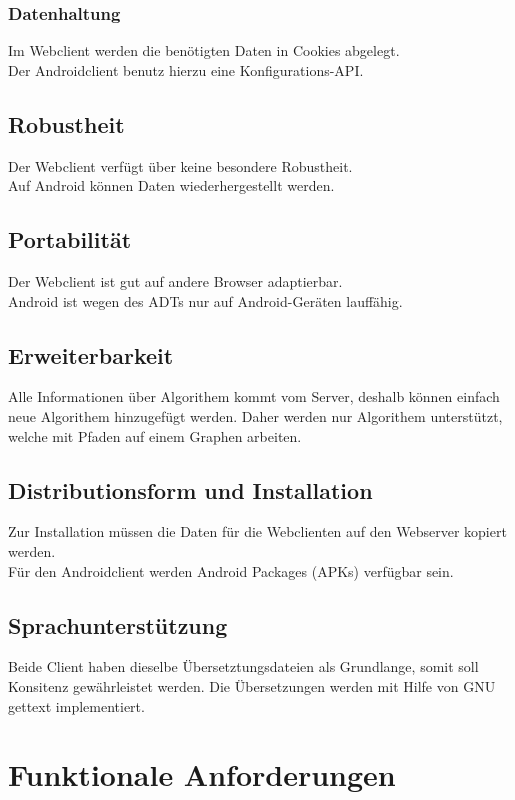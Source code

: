 \documentclass[a4paper,10pt,titlepage]{article}
\begin{document}
\subsubsection{Datenhaltung}
\label{datenhaltung}
Im Webclient werden die benötigten Daten in Cookies abgelegt.\\
Der Androidclient benutz hierzu eine Konfigurations-API.

\subsection{Robustheit}
Der Webclient verfügt über keine besondere Robustheit.\\
Auf Android können Daten wiederhergestellt werden.

\subsection{Portabilität}
Der Webclient ist gut auf andere Browser adaptierbar.\\
Android ist wegen des ADTs nur auf Android-Geräten lauffähig.

\subsection{Erweiterbarkeit}
Alle Informationen über Algorithem kommt vom Server, deshalb können einfach neue Algorithem hinzugefügt werden.
Daher werden nur Algorithem unterstützt, welche mit Pfaden auf einem Graphen arbeiten.

\subsection{Distributionsform und Installation}
Zur Installation müssen die Daten für die Webclienten auf den Webserver kopiert werden.\\
Für den Androidclient werden Android Packages (APKs) verfügbar sein.

\subsection{Sprachunterstützung}
Beide Client haben dieselbe Übersetztungsdateien als Grundlange, somit soll Konsitenz gewährleistet werden.
Die Übersetzungen werden mit Hilfe von GNU gettext implementiert.

\clearpage
\section{Funktionale Anforderungen}
\end{document}
